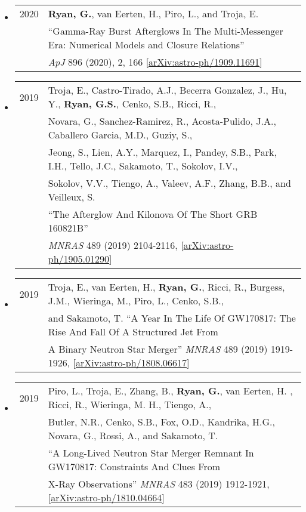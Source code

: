 \begin{itemize}
\item \begin{tabular}{ll}
2020 & {\bf {Ryan}, G.}, {van Eerten}, H., {Piro}, L., and {Troja}, E. \\
	& ``Gamma-Ray Burst Afterglows In The Multi-Messenger Era: Numerical Models and Closure Relations'' \\
	& \emph{ApJ} 896 (2020), 2, 166 [\href{https://arxiv.org/abs/1909.11691}{arXiv:astro-ph/1909.11691}]
\end{tabular}

\item \begin{tabular}{ll}
2019 & {Troja}, E., {Castro-Tirado}, A.J.,  {Becerra Gonzalez}, J.,
         {Hu}, Y., {\bf {Ryan}, G.S.}, {Cenko}, S.B., {Ricci}, R., \\ &
         {Novara}, G., {Sanchez-Ramirez}, R., {Acosta-Pulido}, J.A.,
         {Caballero Garcia}, M.D., {Guziy}, S.,  \\ &
         {Jeong}, S.,
         {Lien}, A.Y., {Marquez}, I., {Pandey}, S.B., {Park}, I.H.,
         {Tello}, J.C., {Sakamoto}, T., {Sokolov}, I.V., \\ &
         {Sokolov}, V.V., {Tiengo}, A., {Valeev}, A.F.,
         {Zhang}, B.B., and {Veilleux}, S. \\ &``The Afterglow And Kilonova Of The Short GRB 160821B'' \\ &
         \emph{MNRAS} 489 (2019) 2104-2116, [\href{https://arxiv.org/abs/1905.01290}{arXiv:astro-ph/1905.01290}]
\end{tabular}

\item \begin{tabular}{ll}
2019 & Troja, E., van Eerten, H., {\bf Ryan, G.}, Ricci, R., Burgess, J.M., Wieringa, M., Piro, L., Cenko, S.B.,\\
	& and Sakamoto, T. ``A Year In The Life Of GW170817: The Rise And Fall Of A Structured Jet From\\
	&  A Binary Neutron Star Merger'' \emph{MNRAS} 489 (2019) 1919-1926, [\href{https://arxiv.org/abs/1808.06617}{arXiv:astro-ph/1808.06617}]
\end{tabular}

\item \begin{tabular}{ll}
2019 &  Piro, L., Troja, E., Zhang, B., {\bf Ryan, G.}, van Eerten, H. , Ricci, R., Wieringa, M. H., Tiengo, A.,\\
	& Butler, N.R., Cenko, S.B., Fox, O.D., Kandrika, H.G., Novara, G., Rossi, A., and Sakamoto, T. \\
	& ``A Long-Lived Neutron Star Merger Remnant In GW170817: Constraints And Clues From\\
	& X-Ray Observations'' \emph{MNRAS} 483 (2019) 1912-1921, [\href{https://arxiv.org/abs/1810.04664}{arXiv:astro-ph/1810.04664}]
\end{tabular}


\end{itemize}
